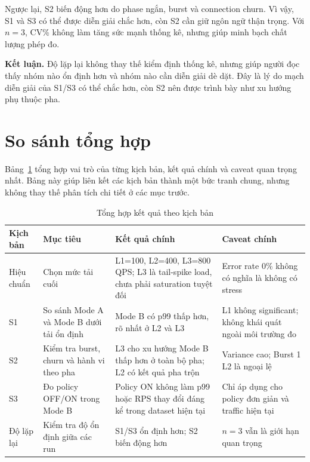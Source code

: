 Ngược lại, S2 biến động hơn do phase ngắn, burst và connection churn. Vì vậy, S1 và S3 có thể được diễn giải chắc hơn, còn S2 cần giữ ngôn ngữ thận trọng. Với \(n=3\), CV\% không làm tăng sức mạnh thống kê, nhưng giúp minh bạch chất lượng phép đo.

\textbf{Kết luận.} Độ lặp lại không thay thế kiểm định thống kê, nhưng giúp người đọc thấy nhóm nào ổn định hơn và nhóm nào cần diễn giải dè dặt. Đây là lý do mạch diễn giải của S1/S3 có thể chắc hơn, còn S2 nên được trình bày như xu hướng phụ thuộc pha.

\section{So sánh tổng hợp}

Bảng~\ref{tab:scenario-synthesis} tổng hợp vai trò của từng kịch bản, kết quả chính và caveat quan trọng nhất. Bảng này giúp liên kết các kịch bản thành một bức tranh chung, nhưng không thay thế phân tích chi tiết ở các mục trước.

\begin{table}[H]
\centering
\caption{Tổng hợp kết quả theo kịch bản}
\label{tab:scenario-synthesis}
\scriptsize
\setlength{\tabcolsep}{2.5pt}
\renewcommand{\arraystretch}{1.28}
\begin{tabularx}{\textwidth}{>{\raggedright\arraybackslash}p{2.0cm}>{\raggedright\arraybackslash}p{3.0cm}>{\raggedright\arraybackslash}X>{\raggedright\arraybackslash}p{3.0cm}}
\toprule
\textbf{Kịch bản} & \textbf{Mục tiêu} & \textbf{Kết quả chính} & \textbf{Caveat chính} \\
\midrule
Hiệu chuẩn & Chọn mức tải cuối & L1=100, L2=400, L3=800 QPS; L3 là tail-spike load, chưa phải saturation tuyệt đối & Error rate 0\% không có nghĩa là không có stress \\
S1 & So sánh Mode A và Mode B dưới tải ổn định & Mode B có p99 thấp hơn, rõ nhất ở L2 và L3 & L1 không significant; không khái quát ngoài môi trường đo \\
S2 & Kiểm tra burst, churn và hành vi theo pha & L3 cho xu hướng Mode B thấp hơn ở toàn bộ pha; L2 có kết quả pha trộn & Variance cao; Burst 1 L2 là ngoại lệ \\
S3 & Đo policy OFF/ON trong Mode B & Policy ON không làm p99 hoặc RPS thay đổi đáng kể trong dataset hiện tại & Chỉ áp dụng cho policy đơn giản và traffic hiện tại \\
Độ lặp lại & Kiểm tra độ ổn định giữa các run & S1/S3 ổn định hơn; S2 biến động hơn & \(n=3\) vẫn là giới hạn quan trọng \\
\bottomrule
\end{tabularx}
\end{table}

